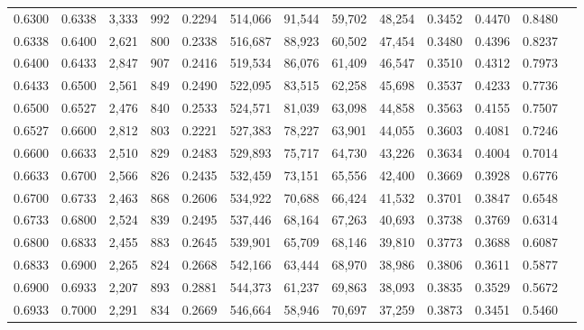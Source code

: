 \begin{tabular}{rrrrrrrrrrrrr}
0.6300 & 0.6338 &  3,333 &   992 &                                     0.2294 & 514,066 &  91,544 &  59,702 &  48,254 & 0.3452 & 0.4470 & 0.8480 \\
0.6338 & 0.6400 &  2,621 &   800 &                                     0.2338 & 516,687 &  88,923 &  60,502 &  47,454 & 0.3480 & 0.4396 & 0.8237 \\
0.6400 & 0.6433 &  2,847 &   907 &                                     0.2416 & 519,534 &  86,076 &  61,409 &  46,547 & 0.3510 & 0.4312 & 0.7973 \\
0.6433 & 0.6500 &  2,561 &   849 &                                     0.2490 & 522,095 &  83,515 &  62,258 &  45,698 & 0.3537 & 0.4233 & 0.7736 \\
0.6500 & 0.6527 &  2,476 &   840 &                                     0.2533 & 524,571 &  81,039 &  63,098 &  44,858 & 0.3563 & 0.4155 & 0.7507 \\
0.6527 & 0.6600 &  2,812 &   803 &                                     0.2221 & 527,383 &  78,227 &  63,901 &  44,055 & 0.3603 & 0.4081 & 0.7246 \\
0.6600 & 0.6633 &  2,510 &   829 &                                     0.2483 & 529,893 &  75,717 &  64,730 &  43,226 & 0.3634 & 0.4004 & 0.7014 \\
0.6633 & 0.6700 &  2,566 &   826 &                                     0.2435 & 532,459 &  73,151 &  65,556 &  42,400 & 0.3669 & 0.3928 & 0.6776 \\
0.6700 & 0.6733 &  2,463 &   868 &                                     0.2606 & 534,922 &  70,688 &  66,424 &  41,532 & 0.3701 & 0.3847 & 0.6548 \\
0.6733 & 0.6800 &  2,524 &   839 &                                     0.2495 & 537,446 &  68,164 &  67,263 &  40,693 & 0.3738 & 0.3769 & 0.6314 \\
0.6800 & 0.6833 &  2,455 &   883 &                                     0.2645 & 539,901 &  65,709 &  68,146 &  39,810 & 0.3773 & 0.3688 & 0.6087 \\
0.6833 & 0.6900 &  2,265 &   824 &                                     0.2668 & 542,166 &  63,444 &  68,970 &  38,986 & 0.3806 & 0.3611 & 0.5877 \\
0.6900 & 0.6933 &  2,207 &   893 &                                     0.2881 & 544,373 &  61,237 &  69,863 &  38,093 & 0.3835 & 0.3529 & 0.5672 \\
0.6933 & 0.7000 &  2,291 &   834 &                                     0.2669 & 546,664 &  58,946 &  70,697 &  37,259 & 0.3873 & 0.3451 & 0.5460 \\

\end{tabular}
